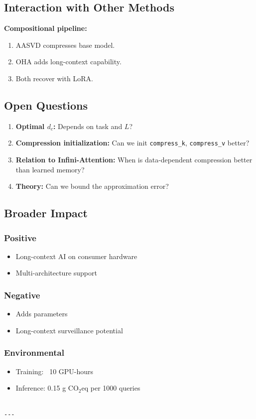 \subsection{Interaction with Other Methods}

\textbf{Compositional pipeline:}

\begin{enumerate}
\item AASVD compresses base model.
\item OHA adds long-context capability.
\item Both recover with LoRA.

\end{enumerate}
\subsection{Open Questions}

\begin{enumerate}
\item \textbf{Optimal $d_c$:} Depends on task and $L$?
\item \textbf{Compression initialization:} Can we init \texttt{compress\_k}, \texttt{compress\_v}
  better?
\item \textbf{Relation to Infini-Attention:} When is data-dependent compression
  better than learned memory?
\item \textbf{Theory:} Can we bound the approximation error?

\end{enumerate}
\subsection{Broader Impact}

\subsubsection{Positive}
\begin{itemize}
\item Long-context AI on consumer hardware
\item Multi-architecture support

\end{itemize}
\subsubsection{Negative}
\begin{itemize}
\item Adds parameters
\item Long-context surveillance potential

\end{itemize}
\subsubsection{Environmental}
\begin{itemize}
\item Training: ~10 GPU-hours
\item Inference: 0.15 g CO$_2$eq per 1000 queries
\end{itemize}
\begin{lstlisting}

---
\end{lstlisting}